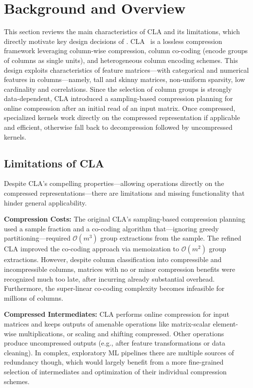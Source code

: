 
\section{Background and Overview}
\label{sec:background}

This section reviews the main characteristics of CLA
and its limitations, which directly motivate key design decisions of \name.
CLA~\cite{ElgoharyBHRR16, ElgoharyBHRR18} is a lossless compression framework leveraging
column-wise compression, column co-coding (encode groups of columns as single units), and heterogeneous column encoding schemes.
This design exploits characteristics of feature matrices---with categorical and numerical features in columns---namely,
tall and skinny matrices, non-uniform sparsity, low cardinality and correlations.
Since the selection of column groups is strongly data-dependent,
CLA introduced a sampling-based compression planning for online compression after
an initial read of an input matrix.
Once compressed, specialized kernels work directly on the compressed representation if applicable and efficient,
otherwise fall back to decompression followed by uncompressed kernels.

\subsection{Limitations of CLA}


Despite CLA's compelling properties---allowing operations directly on the compressed representations---there are limitations and missing functionality that hinder general applicability.

\textbf{Compression Costs:}
The original CLA's \cite{ElgoharyBHRR16} sampling-based compression planning used a sample fraction and a co-coding algorithm
that---ignoring greedy partitioning---required $\mathcal{O}(m^3)$ group extractions from the sample.
The refined CLA \cite{ElgoharyBHRR18} %
improved the co-coding approach via memoization to $\mathcal{O}(m^2)$ group extractions.
However, despite column classification into compressible and incompressible columns,
matrices with no or minor compression benefits were recognized much too late,
after incurring already substantial overhead.
Furthermore, the super-linear co-coding complexity becomes infeasible for millions of columns.

\textbf{Compressed Intermediates:}
CLA performs online compression for input matrices and keeps outputs of amenable operations like matrix-scalar element-wise multiplications,
or scaling and shifting compressed.
Other operations produce uncompressed outputs (e.g., after feature transformations or data cleaning).
In complex, exploratory ML pipelines there are multiple sources of redundancy though,
which would largely benefit from a more fine-grained selection of intermediates and optimization of their individual compression schemes.

